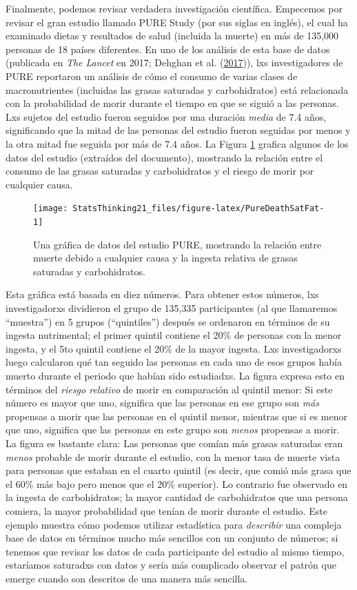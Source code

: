 \documentclass[
  12pt,
]{book}
\begin{document}
Finalmente, podemos revisar verdadera investigación científica. Empecemos por revisar el gran estudio llamado PURE Study (por sus siglas en inglés), el cual ha examinado dietas y resultados de salud (incluida la muerte) en más de 135,000 personas de 18 países diferentes. En uno de los análisis de esta base de datos (publicada en \emph{The Lancet} en 2017; Dehghan et al. (\protect\hyperlink{ref-dehg:ment:zhan:2017}{2017})), lxs investigadores de PURE reportaron un análisis de cómo el consumo de varias clases de macronutrientes (incluidas las grasas saturadas y carbohidratos) está relacionada con la probabilidad de morir durante el tiempo en que se siguió a las personas. Lxs sujetos del estudio fueron seguidos por una duración \emph{media} de 7.4 años, significando que la mitad de las personas del estudio fueron seguidas por menos y la otra mitad fue seguida por más de 7.4 años. La Figura \ref{fig:PureDeathSatFat} grafica algunos de los datos del estudio (extraídos del documento), mostrando la relación entre el consumo de las grasas saturadas y carbohidratos y el riesgo de morir por cualquier causa.

\begin{figure}
\texttt{[image: StatsThinking21\_files/figure-latex/PureDeathSatFat-1]} \caption{Una gráfica de datos del estudio PURE, mostrando la relación entre muerte debido a cualquier causa y la ingesta relativa de grasas saturadas y carbohidratos.}\label{fig:PureDeathSatFat}
\end{figure}

Esta gráfica está basada en diez números. Para obtener estos números, lxs investigadorxs dividieron el grupo de 135,335 participantes (al que llamaremos ``muestra'') en 5 grupos (``quintiles'') después se ordenaron en términos de su ingesta nutrimental; el primer quintil contiene el 20\% de personas con la menor ingesta, y el 5to quintil contiene el 20\% de la mayor ingesta. Lxs investigadorxs luego calcularon qué tan seguido las personas en cada uno de esos grupos había muerto durante el periodo que habían sido estudiadxs. La figura expresa esto en términos del \emph{riesgo relativo} de morir en comparación al quintil menor: Si este número es mayor que uno, significa que las personas en ese grupo son \emph{más} propensas a morir que las personas en el quintil menor, mientras que si es menor que uno, significa que las personas en este grupo son \emph{menos} propensas a morir. La figura es bastante clara: Las personas que comían más grasas saturadas eran \emph{menos} probable de morir durante el estudio, con la menor tasa de muerte vista para personas que estaban en el cuarto quintil (es decir, que comió más grasa que el 60\% más bajo pero menos que el 20\% superior). Lo contrario fue observado en la ingesta de carbohidratos; la mayor cantidad de carbohidratos que una persona comiera, la mayor probabilidad que tenían de morir durante el estudio. Este ejemplo muestra cómo podemos utilizar estadística para \emph{describir} una compleja base de datos en términos mucho más sencillos con un conjunto de números; si tenemos que revisar los datos de cada participante del estudio al mismo tiempo, estaríamos saturadxs con datos y sería más complicado observar el patrón que emerge cuando son descritos de una manera más sencilla.
\end{document}
